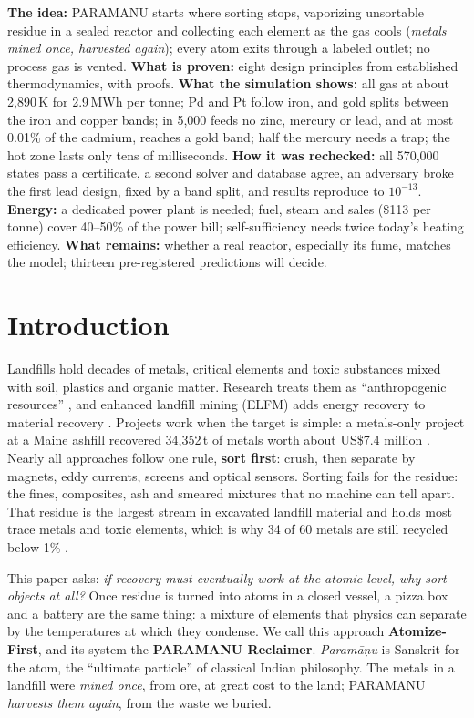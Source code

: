 \documentclass[11pt,a4paper]{article}
\theoremstyle{definition}
\theoremstyle{plain}
\theoremstyle{remark}
\begin{document}
\begin{execsummary}
\textbf{The idea:} PARAMANU starts where sorting stops, vaporizing unsortable residue in a sealed reactor and collecting each element as the gas cools (\emph{metals mined once, harvested again}); every atom exits through a labeled outlet; no process gas is vented. \textbf{What is proven:} eight design principles from established thermodynamics, with proofs. \textbf{What the simulation shows:} all gas at about 2,890\,K for 2.9\,MWh per tonne; Pd and Pt follow iron, and gold splits between the iron and copper bands; in 5,000 feeds no zinc, mercury or lead, and at most 0.01\% of the cadmium, reaches a gold band; half the mercury needs a trap; the hot zone lasts only tens of milliseconds. \textbf{How it was rechecked:} all 570,000 states pass a certificate, a second solver and database agree, an adversary broke the first lead design, fixed by a band split, and results reproduce to $10^{-13}$. \textbf{Energy:} a dedicated power plant is needed; fuel, steam and sales (\$113 per tonne) cover 40--50\% of the power bill; self-sufficiency needs twice today's heating efficiency. \textbf{What remains:} whether a real reactor, especially its fume, matches the model; thirteen pre-registered predictions will decide.
\end{execsummary}

\section{Introduction}

Landfills hold decades of metals, critical elements and toxic substances mixed with soil, plastics and organic matter. Research treats them as ``anthropogenic resources'' \citep{krook2012,winterstetter2015}, and enhanced landfill mining (ELFM) adds energy recovery to material recovery \citep{jones2013}. Projects work when the target is simple: a metals-only project at a Maine ashfill recovered 34,352\,t of metals worth about US\$7.4 million \citep{wagner2015}. Nearly all approaches follow one rule, \textbf{sort first}: crush, then separate by magnets, eddy currents, screens and optical sensors. Sorting fails for the residue: the fines, composites, ash and smeared mixtures that no machine can tell apart. That residue is the largest stream in excavated landfill material \citep{quaghebeur2013,hernandez2018} and holds most trace metals and toxic elements, which is why 34 of 60 metals are still recycled below 1\% \citep[Fig.~4]{graedel2011}.

This paper asks: \emph{if recovery must eventually work at the atomic level, why sort objects at all?} Once residue is turned into atoms in a closed vessel, a pizza box and a battery are the same thing: a mixture of elements that physics can separate by the temperatures at which they condense. We call this approach \textbf{Atomize-First}, and its system the \textbf{PARAMANU Reclaimer}. \emph{Param\={a}\d{n}u} is Sanskrit for the atom, the ``ultimate particle'' of classical Indian philosophy. The metals in a landfill were \emph{mined once}, from ore, at great cost to the land; PARAMANU \emph{harvests them again}, from the waste we buried.
\end{document}
